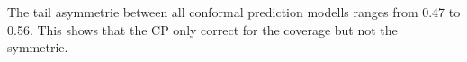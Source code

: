 %
The tail asymmetrie between all conformal prediction modells ranges from 0.47 to 0.56. This shows that the CP only correct for the coverage but not the symmetrie. 
%
